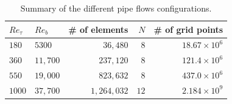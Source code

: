 \documentclass{sig-alternate}
\begin{document}
\begin{table}
\centering
\caption{Summary of the different pipe flows configurations.}
\begin{tabular}{llrrr} 
\hline
$Re_{\tau}$&$Re_{b}$&\# of elements & $N$ & \# of grid points\\ 
\hline
$180$ & $5300$ & $36,480$ & $8$ & $18.67 \times 10^6$\\
$360$ & $11,700$ & $237,120$ & $8$ & $121.4 \times 10^6$\\ 
$550$ & $19,000$ & $823,632$ & $8$ & $437.0 \times 10^6$\\ 
$1000$ & $37,700$ & $1,264,032$ & $12$ & $2.184 \times 10^9$\\
\hline
\end{tabular}
\label{tab:pipe_conf}
\end{table}



\end{document}
